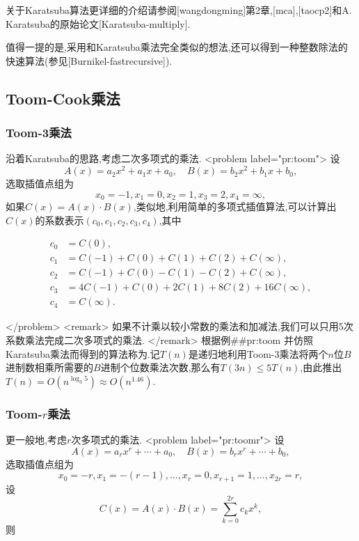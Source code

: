 \documentclass{ctexart}
\newcommand\mtcasCite[1]{[#1]}
\begin{document}
关于Karatsuba算法更详细的介绍请参阅\mtcasCite{wangdongming}第2章,\mtcasCite{mca},\mtcasCite{taocp2}和A. Karatsuba的原始论文\mtcasCite{Karatsuba-multiply}.

值得一提的是,采用和Karatsuba乘法完全类似的想法,还可以得到一种整数除法的快速算法(参见\mtcasCite{Burnikel-fastrecursive}).

\subsection{Toom-Cook乘法}

\subsubsection{Toom-3乘法}

沿着Karatsuba的思路,考虑二次多项式的乘法.
<problem label="pr:toom">
设$$A(x)=a_2x^2+a_1x+a_0,\quad B(x)=b_2x^2+b_1x+b_0,$$选取插值点组为$$x_0=-1,x_1=0,x_2=1,x_3=2,x_4=\infty,$$如果$C(x)=A(x)\cdot B(x)$,类似地,利用简单的多项式插值算法,可以计算出$C(x) $的系数表示$(c_0,c_1,c_2,c_3,c_4)$,其中

\begin{align*}
c_0&=C(0),\\
c_1&=C(-1)+C(0)+C(1)+C(2)+C(\infty),\\
c_2&=C(-1)+C(0)-C(1)-C(2)+C(\infty),\\
c_3&=4C(-1)+C(0)+2C(1)+8C(2)+16C(\infty),\\
c_4&=C(\infty).
\end{align*}

</problem>
<remark>
如果不计乘以较小常数的乘法和加减法,我们可以只用5次系数乘法完成二次多项式的乘法.
</remark>
根据例##pr:toom 并仿照Karatsuba乘法而得到的算法称为.记$T(n)$是递归地利用Toom-3乘法将两个$n$位$B$进制数相乘所需要的$B$进制个位数乘法次数,那么有$T(3n)\le 5T(n)$,由此推出$T(n)=O(n^{\log_3{5}})\approx O(n^{1.46})$.

\subsubsection{Toom-$r$乘法}

更一般地,考虑$r$次多项式的乘法.
<problem label="pr:toomr">
设$$A(x)=a_rx^r+\cdots+a_0,\quad B(x)=b_rx^r+\cdots+b_0,$$选取插值点组为$$x_0=-r,x_1=-(r-1),\ldots,x_r=0,x_{r+1}=1,\ldots,x_{2r}=r,$$设$$C(x)=A(x)\cdot B(x)=\sum_{k=0}^{2r}c_kx^k,$$则
\end{document}
